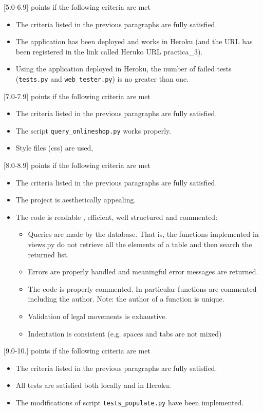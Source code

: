 \documentclass[12pt]{article} %
\newcommand{\ttt}[1]{\texttt{#1}}%
\begin{document}
[5.0-6.9] points if the following criteria are met
 \begin{itemize}
 \item The criteria listed in the previous paragraphs are fully satisfied.
 \item The application has been deployed and works in Heroku (and the URL has been registered in the link called Heruko URL practica\_3). 
 \item Using the application deployed in Heroku, the number of failed tests (\ttt{tests.py} and \ttt{web\_tester.py}) is no greater than one.
\end{itemize}
 
[7.0-7.9] points if the following criteria are met
 \begin{itemize}
 \item The criteria listed in the previous paragraphs are fully satisfied.
 \item The script \texttt{query\_onlineshop.py} works properly.
 \item Style files (css) are used,
 \end{itemize}
 
[8.0-8.9] points if the following criteria are met
 \begin{itemize}
 \item The criteria listed in the previous paragraphs are fully satisfied.
 \item The project is aesthetically appealing.
 \item The code is readable , efficient, well structured and commented:
    \begin{itemize}
        \item Queries are made by the database. That is, the functions implemented in views.py do not retrieve all the elements of a table and then search the returned list.
        \item  Errors are properly handled and meaningful error messages are returned.
        \item  The code is properly commented. In particular functions are commented including the author. Note: the author of a function is unique.
        \item Validation of legal movements is  exhaustive.
        \item Indentation is consistent (e.g. spaces and tabs are not mixed)
    \end{itemize}
\end{itemize}

[9.0-10.] points if the following criteria are met
 \begin{itemize}
 \item The criteria listed in the previous paragraphs are fully satisfied.
 \item All tests are satisfied both locally and in Heroku.
 \item The modifications of script \texttt{tests\_populate.py} have been implemented.
\end{itemize}
\end{document}
